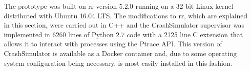 The prototype was built on rr version 5.2.0 running on a 32-bit Linux kernel
distributed with Ubuntu 16.04 LTS.  The modifications to rr, which are
explained in this section, were carried out in C++ and the CrashSimulator
supervisor was implemented in 6260 lines of Python 2.7 code with a 2125
line C extension that allows it to interact with processes using the Ptrace
API.
This version of CrashSimulator is available as a Docker container and,
due to some operating system configuration being necessary, is most easily
installed in this fashion.
